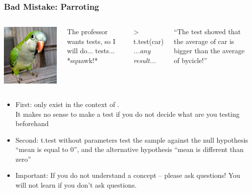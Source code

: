 \documentclass[10pt]{beamer}
\begin{document}
\begin{frame}
  \frametitle{Bad Mistake: Parroting}
  \begin{columns}[T]
    \includegraphics[width=\textwidth]{img/parrot}
    \begin{block}{}
      The professor wants tests, so I will do... tests... *squawk!*
    \end{block}
    
    \smallskip

    > t.test(car)\\
    \emph{...any result...}\\

    \smallskip

    ``The test showed that the average of car is bigger than the average of bycicle!''
  \end{columns}

  \bigskip

  
  {\small
    \begin{itemize}
    \item First:  only exist in the context of
      .\\ \alert{It makes no sense to make a test
        if you do not decide what are you testing beforehand}
    \item Second: t.test without parameters test
      the sample against the null hypothesis ``mean is equal to 0'', and
      the alternative hypothesis ``mean is different than zero''
    \item \alert{Important:} If you do not understand a concept --
      please ask questions! You will not learn if you don't ask
      questions.
    \end{itemize}
    }


\end{frame}
\end{document}

